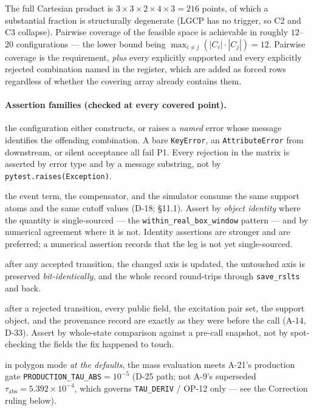 \documentclass[11pt]{article}
\renewcommand{\tt}[1]{\texttt{#1}}
\newcommand{\tabs}{\ensuremath{\tau_{\mathrm{abs}}}}
\begin{document}
The full Cartesian product is $3\times3\times2\times4\times3 = 216$ points, of which a
substantial fraction is structurally degenerate (LGCP has no trigger, so C2 and C3
collapse). Pairwise coverage of the feasible space is achievable in roughly $12$--$20$
configurations --- the lower bound being $\max_{i\neq j}(|C_i|\cdot|C_j|) = 12$. Pairwise
coverage is the requirement, \emph{plus} every explicitly supported and every explicitly
rejected combination named in the register, which are added as forced rows regardless of
whether the covering array already contains them.

\paragraph{Assertion families (checked at every covered point).}
\begin{description}[leftmargin=2.6em,style=nextline,font=\normalfont\bfseries]
  \item[P1 Admissibility] the configuration either constructs, or raises a \emph{named}
  error whose message identifies the offending combination. A bare \tt{KeyError}, an
  \tt{AttributeError} from downstream, or silent acceptance all fail P1. Every rejection
  in the matrix is asserted by error type and by a message substring, not by
  \tt{pytest.raises(Exception)}.
  \item[P2 Leg consistency] the event term, the compensator, and the simulator consume the
  same support atoms and the same cutoff values (D-18; \S11.1). Assert by \emph{object
  identity} where the quantity is single-sourced --- the \tt{within\allowbreak{}\_real\allowbreak{}\_box\allowbreak{}\_window}
  pattern --- and by numerical agreement where it is not. Identity assertions are stronger
  and are preferred; a numerical assertion records that the leg is not yet single-sourced.
  \item[P3 Provenance] after any accepted transition, the changed axis is updated, the
  untouched axis is preserved \emph{bit-identically}, and the whole record round-trips
  through \tt{save\_rslts} and back.
  \item[P4 Transactionality] after a rejected transition, every public field, the
  excitation pair set, the support object, and the provenance record are exactly as they
  were before the call (A-14, D-33). Assert by whole-state comparison against a
  pre-call snapshot, not by spot-checking the fields the fix happened to touch.
  \item[P5 Numerical budget] in polygon mode \emph{at the defaults}, the mass evaluation
  meets A-21's production gate \tt{PRODUCTION\_TAU\_ABS}${}={}10^{-5}$ (D-25 path;
  not A-9's superseded $\tabs = 5.392\times10^{-4}$, which governs \tt{TAU\_DERIV} /
  OP-12 only --- see the Correction ruling below).
\end{description}
\end{document}
